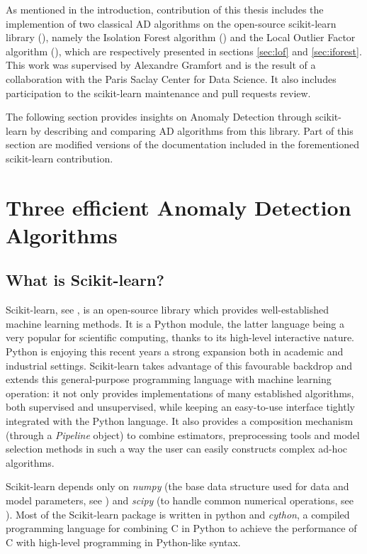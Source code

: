 As mentioned in the introduction, contribution of this thesis includes the implemention of two classical AD algorithms on the open-source scikit-learn library (\cite{sklearn2011}), namely the Isolation Forest algorithm (\cite{Liu2008}) and the Local Outlier Factor algorithm (\cite{Breunig2000LOF}), which are respectively presented in sections \ref{sec:lof} and \ref{sec:iforest}. This work was supervised by Alexandre Gramfort and is the result of a collaboration with the Paris Saclay Center for Data Science. It also includes participation to the scikit-learn maintenance and pull requests review.

The following section provides insights on Anomaly Detection through scikit-learn by describing and comparing AD algorithms from this library. Part of this section are modified versions of the documentation included in the forementioned scikit-learn contribution.

\section{Three efficient Anomaly Detection Algorithms}
\label{sec:AD_sklearn}

\subsection{What is Scikit-learn?}
Scikit-learn, see \cite{sklearn2011}, is an open-source library which provides well-established machine learning methods.
It is a Python module, the latter language being a very popular for scientific computing, thanks to its high-level interactive nature. Python is enjoying this recent years a strong expansion both in academic and industrial settings. Scikit-learn takes advantage of this favourable backdrop and extends this general-purpose programming language with machine learning operation: it not only provides implementations of many established algorithms, both supervised and unsupervised, while keeping an easy-to-use interface tightly integrated with the Python language. It also provides a composition mechanism (through a \emph{Pipeline} object) to combine estimators, preprocessing tools and model selection methods in such a way the user can easily constructs complex ad-hoc algorithms.

Scikit-learn depends only on \emph{numpy} (the base data structure used for data and model parameters, see \cite{Vanderwalt2011numpy}) and \emph{scipy} (to handle common numerical operations, see \cite{Jones2015scipy}).
Most of the Scikit-learn package is written in python and \emph{cython}, a compiled programming language for combining C in Python to achieve the performance of C with high-level programming in Python-like syntax.


